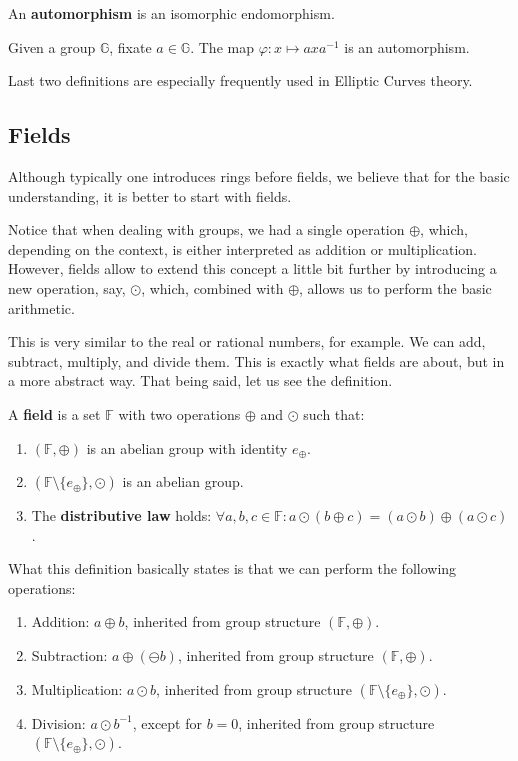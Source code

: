 \documentclass[../lecture-notes-148x210.tex]{subfiles}
\begin{document}
\begin{definition}
    An \textbf{automorphism} is an isomorphic endomorphism.
\end{definition}

\begin{example}
    Given a group $\mathbb{G}$, fixate $a \in \mathbb{G}$. The map $\varphi: x \mapsto axa^{-1}$ is an automorphism.
\end{example}

Last two definitions are especially frequently used in Elliptic Curves theory.

\subsection{Fields}

Although typically one introduces rings before fields, we believe that for the basic understanding, it is better to start with fields. 

Notice that when dealing with groups, we had a single operation $\oplus$, which, depending on the context, is either interpreted as addition or multiplication. 
However, fields allow to extend this concept a little bit further by introducing a new operation, say, $\odot$, which, combined with $\oplus$, allows us to perform the basic arithmetic.

This is very similar to the real or rational numbers, for example. We can add, subtract, multiply, and divide them. This is exactly what fields are about, but in a more abstract way. That being said, let us see the definition.

\begin{definition}
    A \textbf{field} is a set $\mathbb{F}$ with two operations $\oplus$ and $\odot$ such that:
    \begin{enumerate}
        \item $(\mathbb{F}, \oplus)$ is an abelian group with identity $e_{\oplus}$.
        \item $(\mathbb{F} \setminus \{e_{\oplus}\}, \odot)$ is an abelian group.
        \item The \textbf{distributive law} holds: $\forall a,b,c \in \mathbb{F}: a \odot (b \oplus c) = (a \odot b) \oplus (a \odot c)$.
    \end{enumerate}
\end{definition}

What this definition basically states is that we can perform the following operations:
\begin{enumerate}
    \item Addition: $a \oplus b$, inherited from group structure $(\mathbb{F}, \oplus)$.
    \item Subtraction: $a \oplus (\ominus b)$, inherited from group structure $(\mathbb{F}, \oplus)$.
    \item Multiplication: $a \odot b$, inherited from group structure $(\mathbb{F} \setminus \{e_{\oplus}\}, \odot)$.
    \item Division: $a \odot b^{-1}$, except for $b=0$, inherited from group structure $(\mathbb{F} \setminus \{e_{\oplus}\}, \odot)$.
\end{enumerate}
\end{document}
